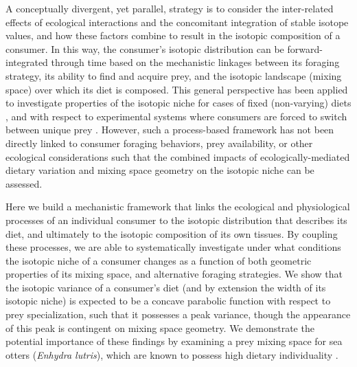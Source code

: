 \documentclass{frontiersSCNS}
\begin{document}
A conceptually divergent, yet parallel, strategy is to consider the inter-related effects of ecological interactions and the concomitant integration of stable isotope values, and how these factors combine to result in the isotopic composition of a consumer.
In this way, the consumer's isotopic distribution can be forward-integrated through time based on the mechanistic linkages between its foraging strategy, its ability to find and acquire prey, and the isotopic landscape (mixing space) over which its diet is composed.
This general perspective has been applied to investigate properties of the isotopic niche for cases of fixed (non-varying) diets \citep{Araujo:2007iua,Araujo:2009p2286}, and with respect to experimental systems where consumers are forced to switch between unique prey \citep{Fink:2012eg}.
However, such a process-based framework has not been directly linked to consumer foraging behaviors, prey availability, or other ecological considerations such that the combined impacts of ecologically-mediated dietary variation and mixing space geometry on the isotopic niche can be assessed.




Here we build a mechanistic framework that links the ecological and physiological processes of an individual consumer to the isotopic distribution that describes its diet, and ultimately to the isotopic composition of its own tissues.
By coupling these processes, we are able to systematically investigate under what conditions the isotopic niche of a consumer changes as a function of both geometric properties of its mixing space, and alternative foraging strategies.
We show that the isotopic variance of a consumer's diet (and by extension the width of its isotopic niche) is expected to be a concave parabolic function with respect to prey specialization, such that it possesses a peak variance, though the appearance of this peak is contingent on mixing space geometry.
We demonstrate the potential importance of these findings by examining a prey mixing space for sea otters (\emph{Enhydra lutris}), which are known to possess high dietary individuality \citep{Estes:2003uc,Tinker:2008tp,Newsome:2009tn,Newsome:2015gy}.
\end{document}
